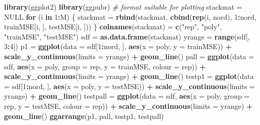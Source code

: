 \documentclass[]{article}
\newenvironment{Shaded}{\begin{snugshade}}{\end{snugshade}}
\newcommand{\CommentTok}[1]{\textcolor[rgb]{0.56,0.35,0.01}{\textit{#1}}}
\newcommand{\ControlFlowTok}[1]{\textcolor[rgb]{0.13,0.29,0.53}{\textbf{#1}}}
\newcommand{\DataTypeTok}[1]{\textcolor[rgb]{0.13,0.29,0.53}{#1}}
\newcommand{\DecValTok}[1]{\textcolor[rgb]{0.00,0.00,0.81}{#1}}
\newcommand{\KeywordTok}[1]{\textcolor[rgb]{0.13,0.29,0.53}{\textbf{#1}}}
\newcommand{\NormalTok}[1]{#1}
\newcommand{\OperatorTok}[1]{\textcolor[rgb]{0.81,0.36,0.00}{\textbf{#1}}}
\newcommand{\OtherTok}[1]{\textcolor[rgb]{0.56,0.35,0.01}{#1}}
\newcommand{\StringTok}[1]{\textcolor[rgb]{0.31,0.60,0.02}{#1}}
\begin{document}
\begin{Shaded}
\begin{Highlighting}[]
\KeywordTok{library}\NormalTok{(ggplot2)}
\KeywordTok{library}\NormalTok{(ggpubr)}
\CommentTok{# format suitable for plotting}
\NormalTok{stackmat =}\StringTok{ }\OtherTok{NULL}
\ControlFlowTok{for}\NormalTok{ (i }\ControlFlowTok{in} \DecValTok{1}\OperatorTok{:}\NormalTok{M) \{}
\NormalTok{    stackmat =}\StringTok{ }\KeywordTok{rbind}\NormalTok{(stackmat, }\KeywordTok{cbind}\NormalTok{(}\KeywordTok{rep}\NormalTok{(i, nord), }\DecValTok{1}\OperatorTok{:}\NormalTok{nord, trainMSE[i, }
\NormalTok{        ], testMSE[i, ]))}
\NormalTok{\}}
\KeywordTok{colnames}\NormalTok{(stackmat) =}\StringTok{ }\KeywordTok{c}\NormalTok{(}\StringTok{"rep"}\NormalTok{, }\StringTok{"poly"}\NormalTok{, }\StringTok{"trainMSE"}\NormalTok{, }\StringTok{"testMSE"}\NormalTok{)}
\NormalTok{sdf =}\StringTok{ }\KeywordTok{as.data.frame}\NormalTok{(stackmat)}
\NormalTok{yrange =}\StringTok{ }\KeywordTok{range}\NormalTok{(sdf[, }\DecValTok{3}\OperatorTok{:}\DecValTok{4}\NormalTok{])}
\NormalTok{p1 =}\StringTok{ }\KeywordTok{ggplot}\NormalTok{(}\DataTypeTok{data =}\NormalTok{ sdf[}\DecValTok{1}\OperatorTok{:}\NormalTok{nord, ], }\KeywordTok{aes}\NormalTok{(}\DataTypeTok{x =}\NormalTok{ poly, }\DataTypeTok{y =}\NormalTok{ trainMSE)) }\OperatorTok{+}\StringTok{ }\KeywordTok{scale_y_continuous}\NormalTok{(}\DataTypeTok{limits =}\NormalTok{ yrange) }\OperatorTok{+}\StringTok{ }
\StringTok{    }\KeywordTok{geom_line}\NormalTok{()}
\NormalTok{pall =}\StringTok{ }\KeywordTok{ggplot}\NormalTok{(}\DataTypeTok{data =}\NormalTok{ sdf, }\KeywordTok{aes}\NormalTok{(}\DataTypeTok{x =}\NormalTok{ poly, }\DataTypeTok{group =}\NormalTok{ rep, }\DataTypeTok{y =}\NormalTok{ trainMSE, }\DataTypeTok{colour =}\NormalTok{ rep)) }\OperatorTok{+}\StringTok{ }
\StringTok{    }\KeywordTok{scale_y_continuous}\NormalTok{(}\DataTypeTok{limits =}\NormalTok{ yrange) }\OperatorTok{+}\StringTok{ }\KeywordTok{geom_line}\NormalTok{()}
\NormalTok{testp1 =}\StringTok{ }\KeywordTok{ggplot}\NormalTok{(}\DataTypeTok{data =}\NormalTok{ sdf[}\DecValTok{1}\OperatorTok{:}\NormalTok{nord, ], }\KeywordTok{aes}\NormalTok{(}\DataTypeTok{x =}\NormalTok{ poly, }\DataTypeTok{y =}\NormalTok{ testMSE)) }\OperatorTok{+}\StringTok{ }\KeywordTok{scale_y_continuous}\NormalTok{(}\DataTypeTok{limits =}\NormalTok{ yrange) }\OperatorTok{+}\StringTok{ }
\StringTok{    }\KeywordTok{geom_line}\NormalTok{()}
\NormalTok{testpall =}\StringTok{ }\KeywordTok{ggplot}\NormalTok{(}\DataTypeTok{data =}\NormalTok{ sdf, }\KeywordTok{aes}\NormalTok{(}\DataTypeTok{x =}\NormalTok{ poly, }\DataTypeTok{group =}\NormalTok{ rep, }\DataTypeTok{y =}\NormalTok{ testMSE, }
    \DataTypeTok{colour =}\NormalTok{ rep)) }\OperatorTok{+}\StringTok{ }\KeywordTok{scale_y_continuous}\NormalTok{(}\DataTypeTok{limits =}\NormalTok{ yrange) }\OperatorTok{+}\StringTok{ }\KeywordTok{geom_line}\NormalTok{()}
\KeywordTok{ggarrange}\NormalTok{(p1, pall, testp1, testpall)}
\end{Highlighting}
\end{Shaded}
\end{document}
